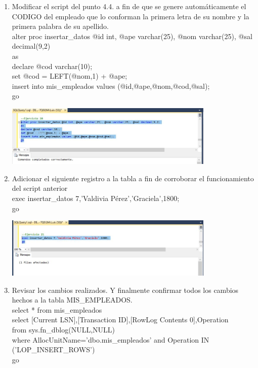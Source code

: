 \begin{enumerate}[1.]
	\item Modificar el script del punto 4.4. a fin de que se genere automáticamente el CODIGO del empleado que lo conforman la primera letra de su nombre y la primera palabra de su apellido.
          \\ alter proc insertar\_datos @id int, @ape varchar(25), @nom varchar(25), @sal decimal(9,2)
          \\as
          \\declare @cod varchar(10);
          \\set @cod = LEFT(@nom,1) + @ape; 
          \\insert into mis\_empleados values (@id,@ape,@nom,@cod,@sal);
          \\go

	\begin{center}
	\includegraphics[width=10cm]{./Imagenes/1ejer20} 
	\end{center}

	\item Adicionar el siguiente registro a la tabla a fin de corroborar el funcionamiento del script anterior
           \\exec insertar\_datos 7,'Valdivia Pérez','Graciela',1800;
           \\go

	\begin{center}
	\includegraphics[width=10cm]{./Imagenes/1ejer21} 
	\end{center}

	\item Revisar los cambios realizados. Y finalmente confirmar todos los cambios hechos a la tabla MIS\_EMPLEADOS.
          \\select * from mis\_empleados
          \\select [Current LSN],[Transaction ID],[RowLog Contents 0],Operation 
          \\from sys.fn\_dblog(NULL,NULL) 
          \\where AllocUnitName='dbo.mis\_empleados' and Operation IN ('LOP\_INSERT\_ROWS')
          \\go


\end{enumerate}
